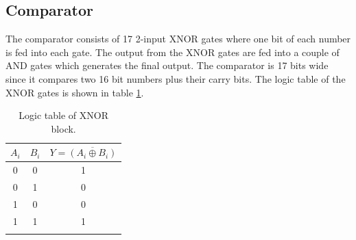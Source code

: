 \subsection{Comparator}
The comparator consists of 17 2-input XNOR gates where one bit of each number is fed into each gate. The output from the XNOR gates are fed into a couple of AND gates which generates the final output. The comparator is 17 bits wide since it compares two 16 bit numbers plus their carry bits. The logic table of the XNOR gates is shown in table \ref{tab:xnor}.

\begin{table}[H]
  \caption{Logic table of XNOR block.}
  \centering
  \begin{tabular}{cc|c}
    \toprule
    $A_i$ & $B_i$ & $Y = \overline{(A_i \oplus B_i)}$ \\
    \midrule
    0 & 0 & 1 \\
    0 & 1 & 0 \\
    1 & 0 & 0 \\
    1 & 1 & 1 \\
    \bottomrule
    \label{tab:xnor}
  \end{tabular}
\end{table}
